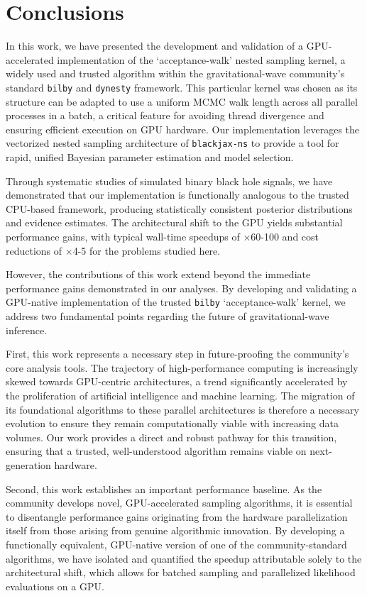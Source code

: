 \documentclass[fleqn,usenatbib]{mnras}
\begin{document}
\section{Conclusions}
\label{sec:conclusions}

In this work, we have presented the development and validation of a
GPU-accelerated implementation of the `acceptance-walk' nested sampling
kernel, a widely used and trusted algorithm within the gravitational-wave
community's standard \texttt{bilby} and \texttt{dynesty} framework. This
particular kernel was chosen as its structure can be adapted to use a
uniform MCMC walk length across all parallel processes in a batch, a
critical feature for avoiding thread divergence and ensuring efficient
execution on GPU hardware. Our implementation leverages the vectorized
nested sampling architecture of \texttt{blackjax-ns} to provide a tool
for rapid, unified Bayesian parameter estimation and model selection.

Through systematic studies of simulated binary black hole signals, we have demonstrated
that our implementation is functionally analogous to the trusted
CPU-based framework, producing statistically consistent posterior
distributions and evidence estimates. The architectural shift to the
GPU yields substantial performance gains, with typical wall-time
speedups of $\times$60-100 and cost reductions of
$\times$4-5 for the problems studied here.

However, the contributions of this work extend beyond the immediate performance
gains demonstrated in our analyses. By developing and validating a
GPU-native implementation of the trusted \texttt{bilby} `acceptance-walk'
kernel, we address two fundamental points regarding the future of
gravitational-wave inference.

First, this work represents a necessary step in future-proofing the
community's core analysis tools. The trajectory of high-performance
computing is increasingly skewed towards GPU-centric architectures, a
trend significantly accelerated by the proliferation of artificial
intelligence and machine learning. The migration of its foundational algorithms to these parallel
architectures is therefore a necessary evolution to ensure they remain
computationally viable with increasing data volumes. Our work provides a direct
and robust pathway for this transition, ensuring that a trusted,
well-understood algorithm remains viable on next-generation hardware.

Second, this work establishes an important
performance baseline. As the community develops novel, GPU-accelerated
sampling algorithms, it is essential to disentangle performance gains
originating from the hardware parallelization itself from those arising
from genuine algorithmic innovation. By developing a functionally
equivalent, GPU-native version of one of the community-standard 
algorithms, we have isolated and quantified the speedup attributable
solely to the architectural shift, which allows for batched sampling and
parallelized likelihood evaluations on a GPU.
\end{document}
